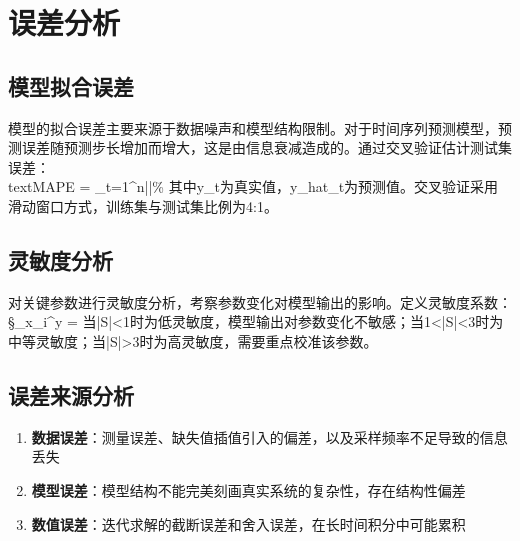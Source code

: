 \newpage
\section{误差分析}

\subsection{模型拟合误差}
模型的拟合误差主要来源于数据噪声和模型结构限制。对于时间序列预测模型，预测误差随预测步长增加而增大，这是由信息衰减造成的。通过交叉验证估计测试集误差：\\text{MAPE} = \sum_{t=1}^{n}\left|\right|\%
其中y_t为真实值，y_hat_t为预测值。交叉验证采用滑动窗口方式，训练集与测试集比例为4:1。

\subsection{灵敏度分析}
对关键参数进行灵敏度分析，考察参数变化对模型输出的影响。定义灵敏度系数：\S_{x_i}^{y} = \cdot{}
当|S|<1时为低灵敏度，模型输出对参数变化不敏感；当1<|S|<3时为中等灵敏度；当|S|>3时为高灵敏度，需要重点校准该参数。

\subsection{误差来源分析}
\begin{enumerate}
\item[(1)] \textbf{数据误差}：测量误差、缺失值插值引入的偏差，以及采样频率不足导致的信息丢失
\item[(2)] \textbf{模型误差}：模型结构不能完美刻画真实系统的复杂性，存在结构性偏差
\item[(3)] \textbf{数值误差}：迭代求解的截断误差和舍入误差，在长时间积分中可能累积
\end{enumerate}

